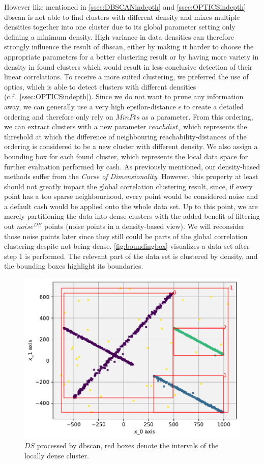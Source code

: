However like mentioned in \autoref{ssec:DBSCANindepth} and \autoref{ssec:OPTICSindepth} \gls{dbscan} is not able to find clusters with different density and mixes multiple densities together into one cluster due to its global parameter setting only defining a minimum density. High variance in data densities can therefore strongly influence the result of \gls{dbscan}, either by making it harder to choose the appropriate parameters for a better clustering result or by having more variety in density in found clusters which would result in less conclusive detection of their linear correlations. 
To receive a more suited clustering, we preferred the use of \gls{optics}, which is able to detect clusters with different densities (c.f.~\autoref{ssec:OPTICSindepth}). Since we do not want to prune any information away, we can generally use a very high epsilon-distance $\epsilon$ to create a detailed ordering and therefore only rely on $MinPts$ as a parameter. From this ordering, we can extract clusters with a new parameter $reachdist_{\tau}$ which represents the threshold at which the difference of neighbouring reachability-distances of the ordering is considered to be a new cluster with different density. We also assign a bounding box for each found cluster, which represents the local data space for further evaluation performed by \gls{cash}. As previously mentioned, our density-based methods suffer from the \textit{Curse of Dimensionality}. However, this property at least should not greatly impact the global correlation clustering result, since, if every point has a too sparse neighbourhood, every point would be considered noise and a default \gls{cash} would be applied onto the whole data set. Up to this point, we are merely partitioning the data into dense clusters with the added benefit of filtering out $noise^{DB}$ points (noise points in a density-based view). We will reconsider those noise points later since they still could be parts of the global correlation clustering despite not being dense. \autoref{fig:boundingbox} visualizes a data set after step 1 is performed. The relevant part of the data set is clustered by density, and the bounding boxes highlight its boundaries.

\begin{figure}[h]
    \centering
    \includegraphics[width=.7\textwidth]{figure_method_grid/DSwithBoundingBoxes.pdf}
    \caption{$DS$ processed by \acrshort{dbscan}, red boxes denote the intervals of the locally dense cluster.}
    \label{fig:boundingbox}
\end{figure}

